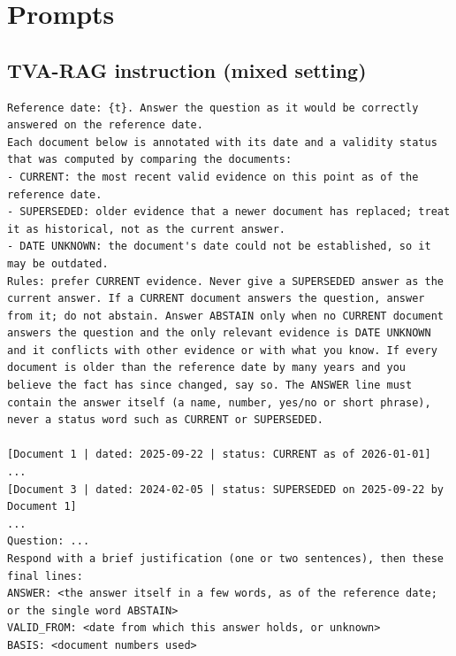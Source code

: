 \documentclass[11pt,a4paper]{report}
\begin{document}
\appendix
\chapter{Prompts}\label{app:prompts}
\section*{TVA-RAG instruction (mixed setting)}
\begin{lstlisting}
Reference date: {t}. Answer the question as it would be correctly answered on the reference date.
Each document below is annotated with its date and a validity status that was computed by comparing the documents:
- CURRENT: the most recent valid evidence on this point as of the reference date.
- SUPERSEDED: older evidence that a newer document has replaced; treat it as historical, not as the current answer.
- DATE UNKNOWN: the document's date could not be established, so it may be outdated.
Rules: prefer CURRENT evidence. Never give a SUPERSEDED answer as the current answer. If a CURRENT document answers the question, answer from it; do not abstain. Answer ABSTAIN only when no CURRENT document answers the question and the only relevant evidence is DATE UNKNOWN and it conflicts with other evidence or with what you know. If every document is older than the reference date by many years and you believe the fact has since changed, say so. The ANSWER line must contain the answer itself (a name, number, yes/no or short phrase), never a status word such as CURRENT or SUPERSEDED.

[Document 1 | dated: 2025-09-22 | status: CURRENT as of 2026-01-01]
...
[Document 3 | dated: 2024-02-05 | status: SUPERSEDED on 2025-09-22 by Document 1]
...
Question: ...
Respond with a brief justification (one or two sentences), then these final lines:
ANSWER: <the answer itself in a few words, as of the reference date; or the single word ABSTAIN>
VALID_FROM: <date from which this answer holds, or unknown>
BASIS: <document numbers used>
\end{lstlisting}
\end{document}

